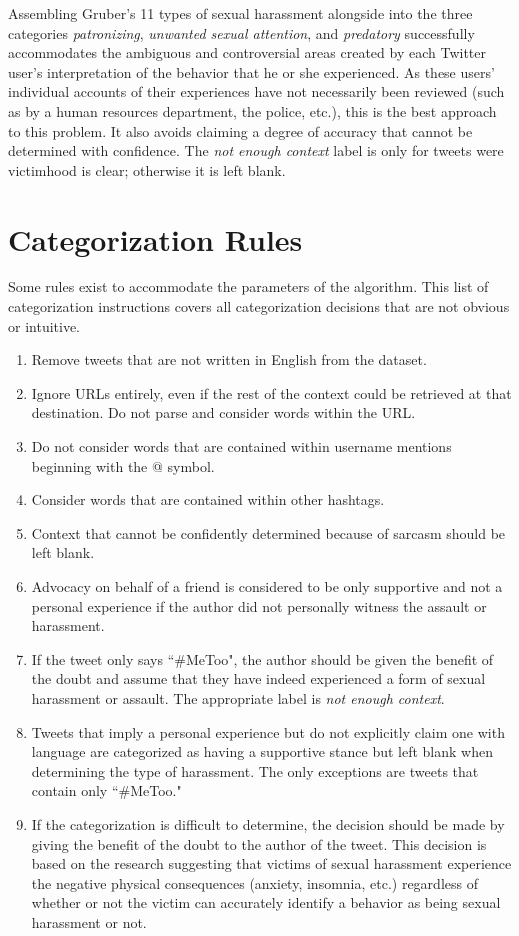 Assembling Gruber's 11 types of sexual harassment alongside into the three categories \textit{patronizing}, \textit{unwanted sexual attention}, and \textit{predatory} successfully accommodates the ambiguous and controversial areas created by each Twitter user's interpretation of the behavior that he or she experienced. As these users' individual accounts of their experiences have not necessarily been reviewed (such as by a human resources department, the police, etc.), this is the best approach to this problem. It also avoids claiming a degree of accuracy that cannot be determined with confidence. The  \textit{not enough context} label is only for tweets were victimhood is clear; otherwise it is left blank.

\section{Categorization Rules}

Some rules exist to accommodate the parameters of the algorithm. This list of categorization instructions covers all categorization decisions that are not obvious or intuitive.

\begin{enumerate}
  \item Remove tweets that are not written in English from the dataset.
  \item Ignore URLs entirely, even if the rest of the context could be retrieved at that destination. Do not parse and consider words within the URL.
  \item Do not consider words that are contained within username mentions beginning with the @ symbol.
  \item Consider words that are contained within other hashtags.
  \item Context that cannot be confidently determined because of sarcasm should be left blank.
  \item Advocacy on behalf of a friend is considered to be only supportive and not a personal experience if the author did not personally witness the assault or harassment.
  \item If the tweet only says ``\#MeToo", the author should be given the benefit of the doubt and assume that they have indeed experienced a form of sexual harassment or assault. The appropriate label is  \textit{not enough context}.
  \item Tweets that imply a personal experience but do not explicitly claim one with language are categorized as having a supportive stance but left blank when determining the type of harassment. The only exceptions are tweets that contain only ``\#MeToo."
  \item If the categorization is difficult to determine, the decision should be made by giving the benefit of the doubt to the author of the tweet. This decision is based on the research suggesting that victims of sexual harassment experience the negative physical consequences (anxiety, insomnia, etc.) regardless of whether or not the victim can accurately identify a behavior as being sexual harassment or not.
\end{enumerate}
